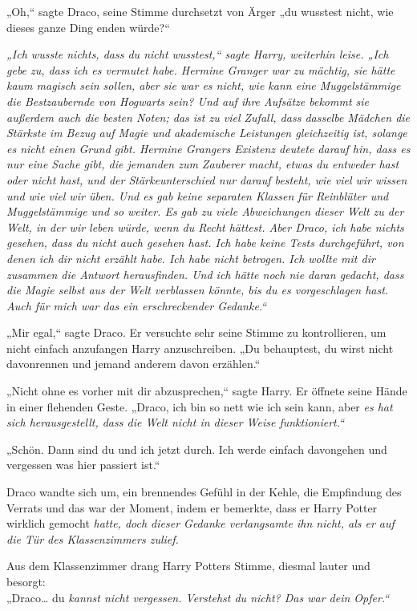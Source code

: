 {„Oh,“ sagte Draco, seine Stimme durchsetzt von Ärger „du wusstest nicht, wie dieses ganze Ding enden würde?“

\emph{„Ich wusste nichts, dass du nicht wusstest,“ sagte Harry, weiterhin leise. „Ich gebe zu, dass ich es vermutet habe. Hermine Granger war zu mächtig, sie hätte kaum magisch sein sollen, aber sie war es nicht, wie kann eine Muggelstämmige die Bestzaubernde von Hogwarts sein? Und auf ihre Aufsätze bekommt sie außerdem auch die besten Noten; das ist zu viel Zufall, dass dasselbe Mädchen die Stärkste im Bezug auf Magie und akademische Leistungen gleichzeitig ist, solange es nicht einen Grund gibt. Hermine Grangers Existenz deutete darauf hin, dass es nur eine Sache gibt, die jemanden zum Zauberer macht, etwas du entweder hast oder nicht hast, und der Stärkeunterschied nur darauf besteht, wie viel wir wissen und wie viel wir üben. Und es gab keine separaten Klassen für Reinblüter und Muggelstämmige und so weiter. Es gab zu viele Abweichungen dieser Welt zu der Welt, in der wir leben würde, wenn du Recht hättest. Aber Draco, ich habe nichts gesehen, dass du nicht auch gesehen hast. Ich habe keine Tests durchgeführt, von denen ich dir nicht erzählt habe. Ich habe nicht betrogen. Ich wollte mit dir zusammen die Antwort herausfinden. Und ich hätte noch nie daran gedacht, dass die Magie selbst aus der Welt verblassen könnte, bis du es vorgeschlagen hast. Auch für mich war das ein erschreckender Gedanke.“}

„Mir egal,“ sagte Draco. Er versuchte sehr seine Stimme zu kontrollieren, um nicht einfach anzufangen Harry anzuschreiben. „Du behauptest, du wirst nicht davonrennen und jemand anderem davon erzählen.“

„Nicht ohne es vorher mit dir abzusprechen,“ sagte Harry. Er öffnete seine Hände in einer flehenden Geste. „Draco, ich bin so nett wie ich sein kann, aber \emph{es hat sich herausgestellt, dass die Welt nicht in dieser Weise funktioniert.“}

„Schön. Dann sind du und ich jetzt durch. Ich werde einfach davongehen und vergessen was hier passiert ist.“

Draco wandte sich um, ein brennendes Gefühl in der Kehle, die Empfindung des Verrats und das war der Moment, indem er bemerkte, dass er Harry Potter wirklich gemocht \emph{hatte, doch dieser Gedanke verlangsamte ihn nicht, als er auf die Tür des Klassenzimmers zulief.}

Aus dem Klassenzimmer drang Harry Potters Stimme, diesmal lauter und besorgt:\\ „Draco… du \emph{kannst nicht vergessen. Verstehst du nicht? Das war dein Opfer.“}

}

